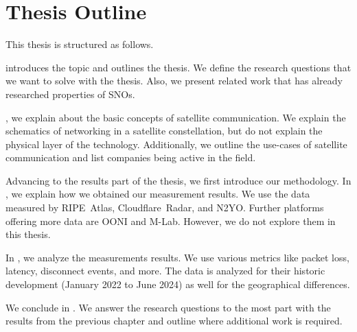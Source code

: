 \section{Thesis Outline}

This thesis is structured as follows.

 introduces the topic and outlines the thesis. We define
the research questions that we want to solve with the thesis. Also, we present
related work that has already researched properties of \ac{SNO}s.

, we explain about the basic concepts of satellite
communication. We explain the schematics of networking in a satellite
constellation, but do not explain the physical layer of the technology.
Additionally, we outline the use-cases of satellite communication and list
companies being active in the field.

Advancing to the results part of the thesis, we first introduce our
methodology. In , we explain how we obtained our
measurement results. We use the data measured by RIPE~Atlas, Cloudflare~Radar,
and N2YO. Further platforms offering more data are OONI and M-Lab. However, we
do not explore them in this thesis.

In , we analyze the measurements results. We use various
metrics like packet loss, latency, disconnect events, and more. The data is
analyzed for their historic development (January 2022 to June 2024) as well for
the geographical differences.

We conclude in . We answer the research questions to the
most part with the results from the previous chapter and outline where
additional work is required.
